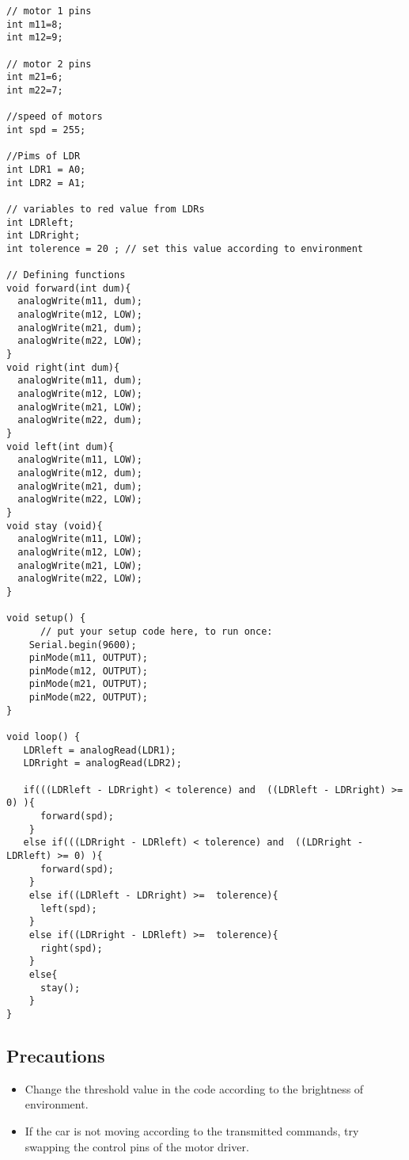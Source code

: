 \begin{lstlisting}[language=Arduino, numbers=none, caption={Code for light-following car}, captionpos=b, label={list:light-car}]
// motor 1 pins 
int m11=8;
int m12=9;

// motor 2 pins
int m21=6;
int m22=7;

//speed of motors 
int spd = 255;

//Pims of LDR
int LDR1 = A0;
int LDR2 = A1;

// variables to red value from LDRs
int LDRleft; 
int LDRright;
int tolerence = 20 ; // set this value according to environment 

// Defining functions
void forward(int dum){
  analogWrite(m11, dum);
  analogWrite(m12, LOW);
  analogWrite(m21, dum);
  analogWrite(m22, LOW);
}
void right(int dum){
  analogWrite(m11, dum);
  analogWrite(m12, LOW);
  analogWrite(m21, LOW);
  analogWrite(m22, dum);
}
void left(int dum){
  analogWrite(m11, LOW);
  analogWrite(m12, dum);
  analogWrite(m21, dum);
  analogWrite(m22, LOW);
}
void stay (void){
  analogWrite(m11, LOW);
  analogWrite(m12, LOW);
  analogWrite(m21, LOW);
  analogWrite(m22, LOW);
}

void setup() {
      // put your setup code here, to run once:
    Serial.begin(9600);
    pinMode(m11, OUTPUT);
    pinMode(m12, OUTPUT);
    pinMode(m21, OUTPUT);
    pinMode(m22, OUTPUT);
}

void loop() {
   LDRleft = analogRead(LDR1); 
   LDRright = analogRead(LDR2);
    
   if(((LDRleft - LDRright) < tolerence) and  ((LDRleft - LDRright) >= 0) ){
      forward(spd);
    }
   else if(((LDRright - LDRleft) < tolerence) and  ((LDRright - LDRleft) >= 0) ){
      forward(spd);
    }
    else if((LDRleft - LDRright) >=  tolerence){
      left(spd);
    }
    else if((LDRright - LDRleft) >=  tolerence){
      right(spd);
    }
    else{
      stay();
    }
}
\end{lstlisting}

\subsection*{Precautions}
\begin{itemize}[leftmargin=*]
    \item Change the threshold value in the code according to the brightness of environment.
    \item If the car is not moving according to the transmitted commands, try swapping the control pins of the motor driver.
\end{itemize}